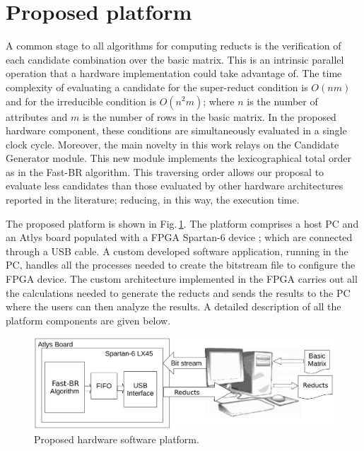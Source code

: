 \documentclass[authoryear,preprint,review,12pt]{elsarticle}
\begin{document}
\section{Proposed platform}
\label{sect:3}

A common stage to all algorithms for computing reducts is 
the verification of each candidate combination over the basic matrix. 
This is an intrinsic parallel operation that a hardware implementation 
could take advantage of.
The time complexity of evaluating a candidate for the super-reduct condition is
$O(nm)$ and for the irreducible condition is $O(n^2m)$; where $n$ is the number of 
attributes and $m$ is the number of rows in the basic matrix. In the proposed hardware
component, these conditions are simultaneously evaluated in a single clock cycle.
Moreover, the main novelty in this work relays on the Candidate Generator module. This new module
implements the lexicographical total order~\citep{R22} as in the Fast-BR algorithm.
This traversing order allows our proposal to evaluate less candidates than 
those evaluated by other hardware architectures reported in the literature; reducing, 
in this way, the execution time.

The proposed platform is shown in Fig.\,\ref{figArq}. The platform comprises a host PC and 
an Atlys board populated with a FPGA Spartan-6 device \citep{R15}; which are connected through a USB cable. A custom developed software application,
running in the PC, handles all the processes needed to create the bitstream file to configure the FPGA device. The custom architecture implemented in the 
FPGA carries out all the calculations needed to generate the reducts and sends the results to the PC where the users can then analyze the results. A detailed description of all the platform components are given below.

\begin{figure}[htb]
    \begin{center}
       \includegraphics[width=13cm]{Arquitecture_fast-br.eps}
    \end{center}
\caption{Proposed hardware software platform.}
\label{figArq}
\end{figure}
\end{document}
